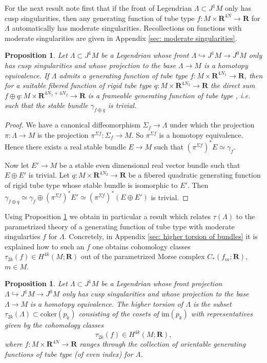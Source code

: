 \documentclass{amsart}
\def\bR{\mathbf{R}}
\newtheorem{proposition}[theorem]{Proposition}
\theoremstyle{definition}
\theoremstyle{remark}
\newtheorem{inductive lemma}[theorem]{Inductive Lemma}
\begin{document}
For the next result note first that if the front of  Legendrian $\Lambda \subset J^1M$ only has cusp singularities, then any generating function of tube type $f: M \times \bR^{4N} \to \bR$ for $\Lambda$ automatically has moderate singularities. Recollections on functions with moderate singularities are given in Appendix \ref{sec: moderate singularities}. 

\begin{proposition}\label{prop: framing for special Leg}
Let $\Lambda \subset J^1M$ be a Legendrian whose front  $\Lambda \hookrightarrow J^1M \to J^0M$ only has cusp singularities and whose projection to the base $\Lambda \to M$ is a homotopy equivalence. If $\Lambda$ admits a generating function of tube type $f:M \times \bR^{4N_1} \to \bR$, then for a suitable fibered function of rigid tube type $q:M \times \bR^{4N_2} \to \bR$ the direct sum $f \oplus q : M \times \bR^{4N_1+4N_2} \to \bR$ is a frameable generating function of tube type , i.e. such that the stable bundle $\gamma_{f \oplus q}$ is trivial. \end{proposition}

\begin{proof} We have a canonical diffeomorphism $\Sigma_f \to \Lambda$ under which the projection $\pi:\Lambda \to M$ is the projection $\pi^{\Sigma f}:\Sigma_f \to M$. So $\pi^{\Sigma f}$ is a homotopy equivalence. Hence there exists a real stable bundle $E \to M$ such that $(\pi^{\Sigma f})^*E \simeq \gamma_f$. 

Now let $E' \to M$ be a stable even dimensional real vector bundle such that $E \oplus E'$ is trivial. Let $q:M \times \bR^{4N_2} \to \bR$ be a fibered quadratic generating function of rigid tube type whose stable bundle is isomorphic to $E'$. Then $\gamma_{f \oplus q} \simeq \gamma_f \oplus (\pi^{\Sigma f})^*E' \simeq (\pi^{\Sigma f})^*(E \oplus E')$ is trivial. \end{proof}

Using Proposition \ref{prop: framing for special Leg} we obtain in particular a result which relates $\tau(\Lambda)$ to the parametrized theory of a generating function of tube type with moderate singularties $f$ for $\Lambda$. Concretely, in Appendix \ref{sec: higher torsion of bundles} it is explained how to such an $f$ one obtains cohomology classes $\tau_{2k}(f) \in H^{4k}(M;\bR)$ out of the parametrized Morse complex $C_*(f_m;\bR)$, $m \in M$. 

\begin{proposition}\label{prop: torsion for special Leg}
Let $\Lambda \subset J^1M$ be a Legendrian whose front projection $\Lambda \hookrightarrow J^1M \to J^0M$ only has cusp singularities and whose projection to the base $\Lambda \to M$ is a homotopy equivalence. The higher torsion of $\Lambda$ is the subset $\tau_{2k}(\Lambda) \subset \text{coker}(p_k)$ consisting of the cosets of $\text{im}(p_k)$ with representatives given by the cohomology classes $$\tau_{2k}(f)\in H^{4k}(M;\bR),$$ where $f:M \times \bR^{4N} \to \bR$ ranges through the collection of orientable generating functions of tube type (of even index) for $\Lambda$. 
\end{proposition}
\end{document}
